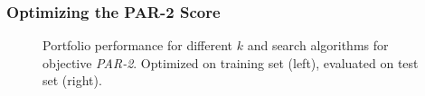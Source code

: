\documentclass[conference]{IEEEtran}
\begin{document}
\subsubsection{Optimizing the PAR-2 Score}

\begin{figure}[t]
	\centering
	\hfil
	\caption{
		Portfolio performance for different $k$ and search algorithms for objective \emph{PAR-2}.
		Optimized on training set (left), evaluated on test set (right). 
	}
\label{fig:search-train-objective}
\end{figure}
\end{document}
